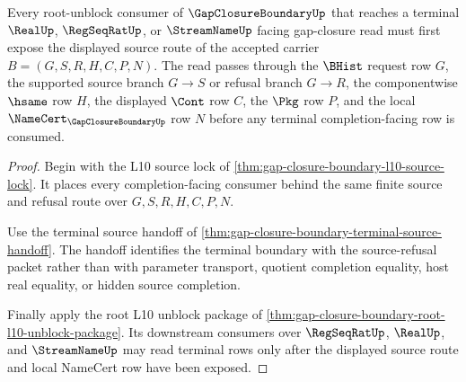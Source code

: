 \begin{theorem}
\label{thm:gapclosureboundary-terminal-source-route-exposure}
Every root-unblock consumer of $\GapClosureBoundaryUp$ that reaches a terminal $\RealUp$, $\RegSeqRatUp$, or $\StreamNameUp$ facing gap-closure read must first expose the displayed source route of the accepted carrier $B=(G,S,R,H,C,P,N)$. The read passes through the $\BHist$ request row $G$, the supported source branch $G \longrightarrow S$ or refusal branch $G \longrightarrow R$, the componentwise $\hsame$ row $H$, the displayed $\Cont$ row $C$, the $\Pkg$ row $P$, and the local $\NameCert_{\GapClosureBoundaryUp}$ row $N$ before any terminal completion-facing row is consumed.
\end{theorem}
\begin{proof}
Begin with the L10 source lock of \autoref{thm:gap-closure-boundary-l10-source-lock}. It places every completion-facing consumer behind the same finite source and refusal route over $G,S,R,H,C,P,N$.

Use the terminal source handoff of \autoref{thm:gap-closure-boundary-terminal-source-handoff}. The handoff identifies the terminal boundary with the source-refusal packet rather than with parameter transport, quotient completion equality, host real equality, or hidden source completion.

Finally apply the root L10 unblock package of \autoref{thm:gap-closure-boundary-root-l10-unblock-package}. Its downstream consumers over $\RegSeqRatUp$, $\RealUp$, and $\StreamNameUp$ may read terminal rows only after the displayed source route and local NameCert row have been exposed.
\end{proof}

